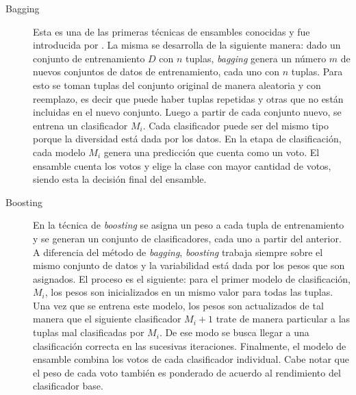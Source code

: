 \begin{description}

	\item[Bagging] Esta es una de las primeras técnicas de ensambles conocidas y
	      fue introducida por
	      \citeauthor{breiman_bagging_1996}\cite{breiman_bagging_1996}. La misma se
	      desarrolla de la siguiente manera: dado un conjunto de entrenamiento $D$
	      con $n$  tuplas, \textit{bagging} genera un número $m$ de nuevos conjuntos
	      de datos de entrenamiento, cada uno con $n$ tuplas. Para esto se toman
	      tuplas del conjunto original de manera aleatoria y con reemplazo, es decir
	      que puede haber tuplas repetidas y otras que no están incluidas en el
	      nuevo conjunto.  Luego a partir de cada conjunto nuevo, se entrena un
	      clasificador $M_{i}$. Cada clasificador puede ser del mismo tipo porque la
	      diversidad está dada por los datos. En la etapa de clasificación, cada
	      modelo $M_{i}$ genera una predicción que cuenta como un voto. El ensamble
	      cuenta los votos y elige la clase con mayor cantidad de votos, siendo esta
	      la decisión final del ensamble.


	\item[Boosting] En la técnica de \textit{boosting} se asigna un peso a cada
	      tupla de entrenamiento y se generan un conjunto de clasificadores, cada
	      uno a partir del anterior. A diferencia del método de \textit{bagging},
	      \textit{boosting} trabaja siempre sobre el mismo conjunto de datos y la
	      variabilidad está dada por los pesos que son asignados. El proceso es el
	      siguiente: para el primer modelo de clasificación, $M_{i}$, los pesos son
	      inicializados en un mismo valor para todas las tuplas. Una vez que se
	      entrena este modelo, los pesos son actualizados de tal manera que el
	      siguiente clasificador $M_{i} + 1$ trate de manera particular a las tuplas
	      mal clasificadas por $M_{i}$. De ese modo se busca llegar a una
	      clasificación correcta en las sucesivas iteraciones.  Finalmente, el
	      modelo de ensamble combina los votos de cada clasificador individual. Cabe
	      notar que el peso de cada voto también es ponderado de acuerdo al
	      rendimiento del clasificador base.



\end{description}
